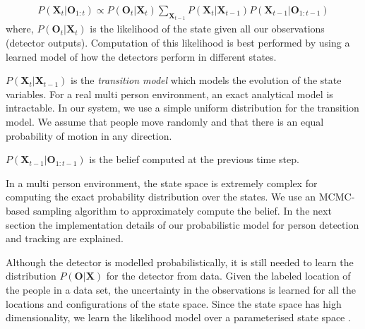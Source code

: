 
\begin{align}
P(\textbf{X}_{t} | \textbf{O}_{1:t}) \propto   P(\textbf{O}_{t} | \textbf{X}_{t}) \sum\limits_{\textbf{X}_{t-1}} P(\textbf{X}_{t}|\textbf{X}_{t-1}) P(\textbf{X}_{t-1}|\textbf{O}_{1:t-1}) \end{align} 
where, $P(\textbf{O}_{t} | \textbf{X}_{t})$ is the likelihood of the state given all our observations (detector outputs). Computation of this likelihood is best performed by using a learned model of how the detectors perform in different states.





$P(\textbf{X}_{t}|\textbf{X}_{t-1})$ is the \textit{transition model} which models the evolution of the state variables. For a real multi person environment, an exact analytical model is intractable. In our system, we use a simple uniform distribution for the transition model. We assume that people move randomly and that there is an equal probability of motion in any direction. 

$P(\textbf{X}_{t-1}|\textbf{O}_{1:t-1})$ is the belief computed at the previous time step.

In a multi person environment, the state space is extremely complex for computing the exact probability 
distribution over the states. We use an MCMC-based sampling algorithm to approximately compute the belief. In the next section the implementation details of our probabilistic model for person detection and tracking are explained.


Although the detector is modelled probabilistically, it is still needed to learn the distribution $P(\textbf{O}|\textbf{X})$ for the detector from data. Given the labeled location of the people in a data set, the uncertainty in the observations is learned for all the locations and configurations of the state space. Since the state space has high dimensionality, we learn the likelihood model over a parameterised state space \cite{berclaz-fleuret-fua-2008}.




